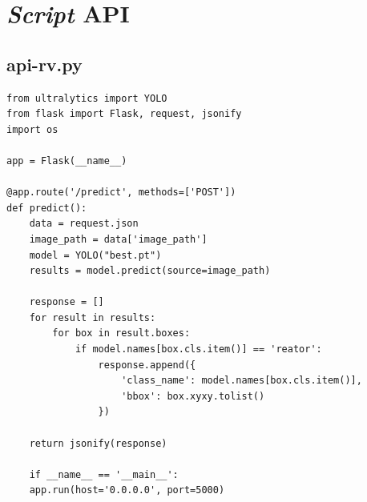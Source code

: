 
\chapter{\textit{Script} API}
\label{chap:script-api}

\section{api-rv.py}


\begin{lstlisting}
from ultralytics import YOLO
from flask import Flask, request, jsonify
import os

app = Flask(__name__)

@app.route('/predict', methods=['POST'])
def predict():
    data = request.json
    image_path = data['image_path']
    model = YOLO("best.pt")
    results = model.predict(source=image_path)

    response = []
    for result in results:
        for box in result.boxes:
            if model.names[box.cls.item()] == 'reator':
                response.append({
                    'class_name': model.names[box.cls.item()],
                    'bbox': box.xyxy.tolist()
                })

    return jsonify(response)

    if __name__ == '__main__':
    app.run(host='0.0.0.0', port=5000)
\end{lstlisting}
